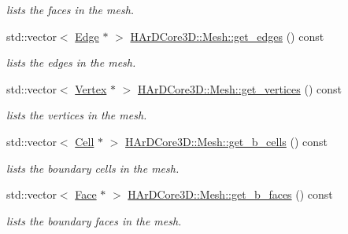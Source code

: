 \begin{DoxyCompactItemize}
\begin{DoxyCompactList}\small\item\em lists the faces in the mesh. \end{DoxyCompactList}\item 
\mbox{\label{group__Mesh_ga0fa81aa91495ca87dd8b134ee46d25fa}} 
std\+::vector$<$ \hyperlink{classHArDCore3D_1_1Edge}{Edge} $\ast$ $>$ \hyperlink{group__Mesh_ga0fa81aa91495ca87dd8b134ee46d25fa}{H\+Ar\+D\+Core3\+D\+::\+Mesh\+::get\+\_\+edges} () const
\begin{DoxyCompactList}\small\item\em lists the edges in the mesh. \end{DoxyCompactList}\item 
\mbox{\label{group__Mesh_ga7809eef99241a3a111d4570f1b388621}} 
std\+::vector$<$ \hyperlink{classHArDCore3D_1_1Vertex}{Vertex} $\ast$ $>$ \hyperlink{group__Mesh_ga7809eef99241a3a111d4570f1b388621}{H\+Ar\+D\+Core3\+D\+::\+Mesh\+::get\+\_\+vertices} () const
\begin{DoxyCompactList}\small\item\em lists the vertices in the mesh. \end{DoxyCompactList}\item 
\mbox{\label{group__Mesh_ga648b0420dce3db1204d4e1b270b57aa2}} 
std\+::vector$<$ \hyperlink{classHArDCore3D_1_1Cell}{Cell} $\ast$ $>$ \hyperlink{group__Mesh_ga648b0420dce3db1204d4e1b270b57aa2}{H\+Ar\+D\+Core3\+D\+::\+Mesh\+::get\+\_\+b\+\_\+cells} () const
\begin{DoxyCompactList}\small\item\em lists the boundary cells in the mesh. \end{DoxyCompactList}\item 
\mbox{\label{group__Mesh_ga1cedb2faebdc7ec891e6d49b74e2d0b3}} 
std\+::vector$<$ \hyperlink{classHArDCore3D_1_1Face}{Face} $\ast$ $>$ \hyperlink{group__Mesh_ga1cedb2faebdc7ec891e6d49b74e2d0b3}{H\+Ar\+D\+Core3\+D\+::\+Mesh\+::get\+\_\+b\+\_\+faces} () const
\begin{DoxyCompactList}\small\item\em lists the boundary faces in the mesh. \end{DoxyCompactList}\item 
\mbox{\label{group__Mesh_gaab118708826029e78cab33759480457d}} 

\end{DoxyCompactItemize}
